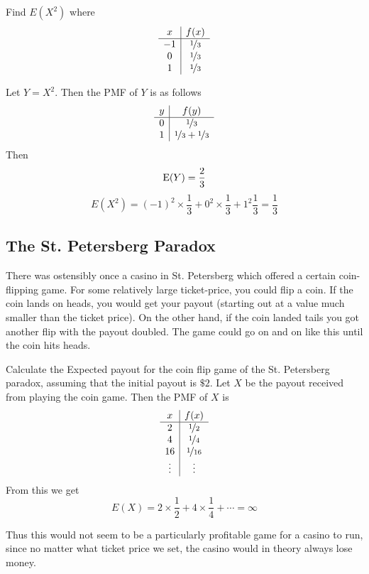 \documentclass{report}
\begin{document}
\begin{example}
    Find $E(X^2)$ where
    \[
        \begin{array}{c|c}
             x & f(x) \\
             \hline
             -1 & \nicefrac 13\\
             0 & \nicefrac 13 \\
             1 & \nicefrac 13
        \end{array}
    \]

    Let $Y=X^2$. Then the PMF of $Y$ is as follows
    \[
        \begin{array}{c|c}
             y & f(y) \\
             \hline
             0 & \nicefrac 13 \\
             1 & \nicefrac 13 + \nicefrac 13
        \end{array}
    \]
    Then 
    \[
        \textup{E}(Y)=\frac 23
    \]
    \[
        E(X^2)=(-1)^2\times \frac 13 + 0^2\times \frac 13 + 1^2 \frac 13 = \frac 13
    \]
\end{example}

\subsection{The St. Petersberg Paradox}
There was ostensibly once a casino in St. Petersberg which offered a certain coin-flipping game. For some relatively large ticket-price, you could flip a coin. If the coin lands on heads, you would get your payout (starting out at a value much smaller than the ticket price). On the other hand, if the coin landed tails you got another flip with the payout doubled. The game could go on and on like this until the coin hits heads.
\begin{example}
    Calculate the Expected payout for the coin flip game of the St. Petersberg paradox, assuming that the initial payout is $\$2$.
    \solution
    Let $X$ be the payout received from playing the coin game. Then the PMF of $X$ is
    \[
        \begin{array}{c|c}
             x & f(x) \\
             \hline
             2 & \nicefrac 12 \\
             4 & \nicefrac 14 \\
             16 & \nicefrac 1{16} \\
             \vdots & \vdots
        \end{array}
    \]
    From this we get
    \[
        E(X) = 2\times \frac 12 + 4 \times \frac 1 4 + \cdots = \infty
    \]
\end{example}
Thus this would not seem to be a particularly profitable game for a casino to run, since no matter what ticket price we set, the casino would in theory always lose money. 
\end{document}
